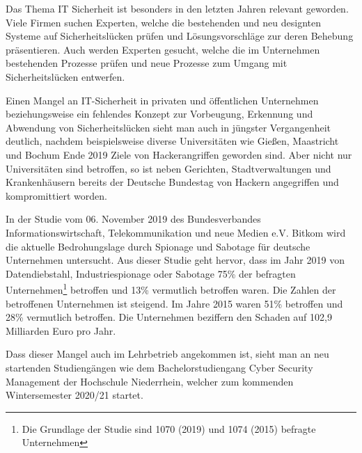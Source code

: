 \label{chap_text:Einleitung}
Das Thema IT Sicherheit ist besonders in den letzten Jahren relevant geworden. Viele Firmen suchen Experten\cite{it-daily.netITSecurityExpertenWerdenHanderingend2019}, welche die bestehenden und neu designten Systeme auf Sicherheitslücken prüfen und Lösungsvorschläge zur deren Behebung präsentieren. Auch werden Experten gesucht, welche die im Unternehmen bestehenden Prozesse prüfen und neue Prozesse zum Umgang mit Sicherheitslücken entwerfen.

Einen Mangel an IT-Sicherheit in privaten und öffentlichen Unternehmen beziehungsweise ein fehlendes Konzept zur Vorbeugung, Erkennung und Abwendung von Sicherheitslücken sieht man auch in jüngster Vergangenheit deutlich, nachdem beispielsweise diverse Universitäten wie Gießen, Maastricht und Bochum Ende 2019 Ziele von Hackerangriffen geworden sind.\cite{schirmacherUniGiessenNaehert2020}\cite{wdrCyberattackeHackerangriffAuf2019}\cite{ruhr24HackerAngriffLegtITSysteme2020} Aber nicht nur Universitäten sind betroffen, so ist neben Gerichten, Stadtverwaltungen und Krankenhäusern bereits der Deutsche Bundestag von Hackern angegriffen und kompromittiert worden.\cite{hurtzHackerAngriffAufGericht2020}\cite{barsigCyberAttackeAufPotsdamer2020}\cite{wellbrockITSicherheitImKrankenhaus2019}\cite{fladeCyberangriffAufBundestag2020}

In der Studie  vom 06. November 2019 des Bundesverbandes Informationswirtschaft, Telekommunikation und neue Medien e.V. Bitkom wird die aktuelle Bedrohungslage durch Spionage und Sabotage für deutsche Unternehmen untersucht. Aus dieser Studie geht hervor, dass im Jahr 2019 von Datendiebstahl, Industriespionage oder Sabotage 75\% der befragten Unternehmen\footnote{Die Grundlage der Studie sind 1070 (2019) und 1074 (2015) befragte Unternehmen} betroffen  und 13\% vermutlich betroffen waren. Die Zahlen der betroffenen Unternehmen ist steigend. Im Jahre 2015 waren  51\% betroffen und 28\% vermutlich betroffen. Die Unternehmen beziffern den Schaden auf 102,9 Milliarden Euro pro Jahr.\cite{bergWirtschaftsschutzDigitalenWelt2019}

Dass dieser Mangel auch im Lehrbetrieb angekommen ist, sieht man an neu startenden Studiengängen wie dem Bachelorstudiengang Cyber Security Management der Hochschule Niederrhein, welcher zum kommenden Wintersemester 2020/21 startet.\cite{hochschuleniederrheinHackernRoteKarte2020}

